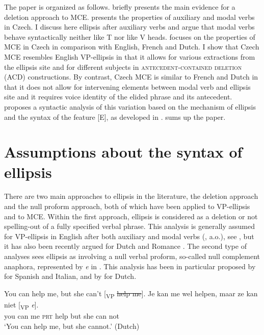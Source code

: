 \documentclass[output=paper,colorlinks,citecolor=brown,
modfonts
]{langscibook}
\begin{document}
\noindent The paper is organized as follows.  briefly presents the main evidence for a deletion approach to MCE.  presents the properties of auxiliary and modal verbs in Czech. I discuss here ellipsis after auxiliary verbs and argue that modal verbs behave syntactically neither like T nor like V heads.  focuses on the properties of MCE in Czech in comparison with English, French and Dutch. I show that Czech MCE resembles English VP-ellipsis in that it allows for various extractions from the ellipsis site and for different subjects in \textsc{antecedent-contained deletion} (ACD) constructions. By contrast, Czech MCE is similar to French and Dutch in that it does not allow for intervening elements between modal verb and ellipsis site and it requires voice identity of the elided phrase and its antecedent.  proposes a syntactic analysis of this variation based on the mechanism of ellipsis and the syntax of the feature [E], as developed in \cite{Aelbrecht2010}.  sums up the paper. 


\section{Assumptions about the syntax of ellipsis}\label{sec:2}

There are two main approaches to ellipsis in the literature, the deletion approach and the null proform approach, both of which have been applied to VP-ellipsis and to MCE. Within the first approach, ellipsis is considered as a deletion or not spelling-out of a fully specified verbal phrase. This analysis is generally assumed for VP-ellipsis in English after both auxiliary and modal verbs (\citealt{ross1967constraints,Sag1976,Hankamer-Sag1976,Merchant2001,Merchant2008a}, a.o.), see , but it has also been recently argued for Dutch \citep{Aelbrecht2008,Aelbrecht2010} and Romance \citep{Dagnac2010}. The second type of analyses sees ellipsis as involving a null verbal proform, so-called null complement anaphora, represented by \textit{e} in . This analysis has been in particular proposed by \cite{Depiante2001} for Spanish and Italian, and by \cite{Lobeck1995} for Dutch. 

\begin{exe}
\ex 
\begin{xlist}
\ex\label{5a} You can help me, but she can't [\textsubscript{VP} \sout{help me}].
\ex \label{5b}
\gll Je    kan me wel  helpen, maar ze kan niet [\textsubscript{VP} \textit{e}].  \\
 you can me \textsc{prt}  help  but  she can not \\
\glt `You can help me, but she cannot.' \hfill (Dutch)
\end{xlist}
\end{exe}
\end{document}
